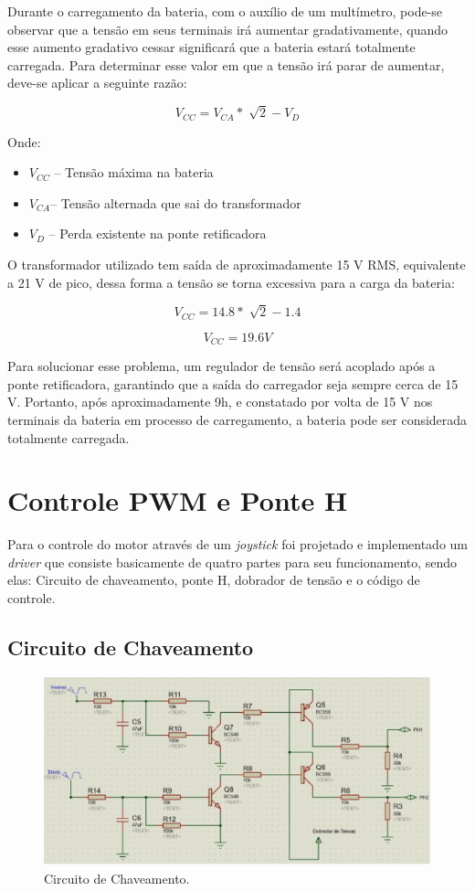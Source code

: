 Durante o carregamento da bateria, com o auxílio de um multímetro, pode-se
observar que a tensão em seus terminais irá aumentar gradativamente, quando
esse aumento gradativo cessar significará que a bateria estará totalmente
carregada. Para determinar esse valor em que a tensão irá parar de aumentar,
deve-se aplicar a seguinte razão: 

\[V_{CC} = V_{CA}*\sqrt[]{2} - V_D\]

Onde: 


\begin{itemize}
    \item \(V_{CC}\) – Tensão máxima na bateria
    \item \(V_{CA}\)– Tensão alternada que sai do transformador
    \item \(V_{D}\) – Perda existente na ponte retificadora
\end{itemize}

O transformador utilizado tem saída de aproximadamente 15 V RMS, equivalente a
21 V de pico, dessa forma a tensão se torna excessiva para a carga da bateria:

\[V_{CC} = 14.8 * \sqrt[]{2} - 1.4\]

\[V_{CC} = 19.6 V\]

Para solucionar esse problema, um regulador de tensão será acoplado após a
ponte retificadora, garantindo que a saída do carregador seja sempre cerca
de 15 V. Portanto, após aproximadamente 9h, e constatado por volta de 15 V
nos terminais da bateria em processo de carregamento, a bateria pode ser
considerada totalmente carregada.

\section{Controle PWM e Ponte H}

Para o controle do motor através de um \textit{joystick} foi projetado e
implementado um \textit{driver} que consiste basicamente de quatro partes para
seu funcionamento, sendo elas: Circuito de chaveamento, ponte H, dobrador de
tensão e o código de controle.

\subsection{Circuito de Chaveamento}

\begin{figure}[h!]
  \centering
  \includegraphics[scale=0.3]{figuras/Chaveamento.jpg}
  \caption{Circuito de Chaveamento.}
\end{figure}

